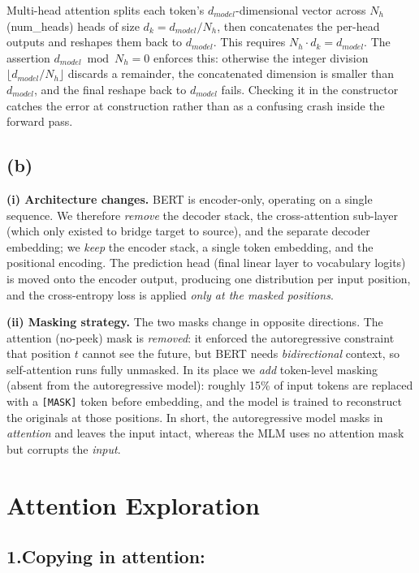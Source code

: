 \documentclass{article}
\begin{document}
Multi-head attention splits each token's $d_{model}$-dimensional vector across $N_h$ (num\_heads) heads of size $d_k = d_{model} / N_h$, then concatenates the per-head outputs and reshapes them back to $d_{model}$. This requires $N_h \cdot d_k = d_{model}$. The assertion $d_{model} \bmod N_h = 0$ enforces this: otherwise the integer division $\lfloor d_{model} / N_h \rfloor$ discards a remainder, the concatenated dimension is smaller than $d_{model}$, and the final reshape back to $d_{model}$ fails. Checking it in the constructor catches the error at construction rather than as a confusing crash inside the forward pass.

\subsection*{(b)}

\noindent\textbf{(i) Architecture changes.} BERT is encoder-only, operating on a single sequence. We therefore \emph{remove} the decoder stack, the cross-attention sub-layer (which only existed to bridge target to source), and the separate decoder embedding; we \emph{keep} the encoder stack, a single token embedding, and the positional encoding. The prediction head (final linear layer to vocabulary logits) is moved onto the encoder output, producing one distribution per input position, and the cross-entropy loss is applied \emph{only at the masked positions}.

\medskip

\noindent\textbf{(ii) Masking strategy.} The two masks change in opposite directions. The attention (no-peek) mask is \emph{removed}: it enforced the autoregressive constraint that position $t$ cannot see the future, but BERT needs \emph{bidirectional} context, so self-attention runs fully unmasked. In its place we \emph{add} token-level masking (absent from the autoregressive model): roughly 15\% of input tokens are replaced with a \texttt{[MASK]} token before embedding, and the model is trained to reconstruct the originals at those positions. In short, the autoregressive model masks in \emph{attention} and leaves the input intact, whereas the MLM uses no attention mask but corrupts the \emph{input}.

\newpage
\section{Attention Exploration}
\subsection*{1.Copying in attention:}
\end{document}
